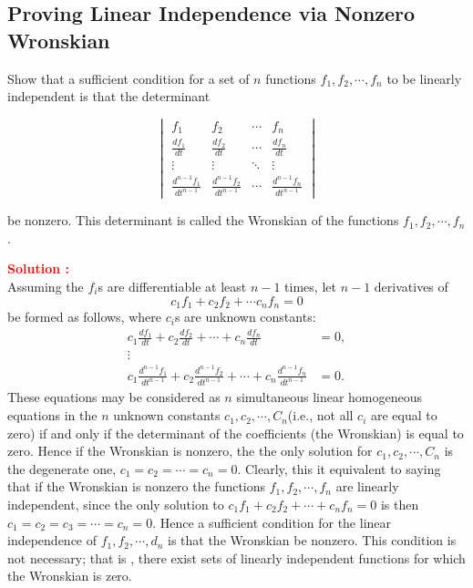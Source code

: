 \documentclass[12pt]{article}
\begin{document}
\clearpage
\subsection{Proving Linear Independence via Nonzero Wronskian}

Show that a sufficient condition for a set of \(n\) functions \(f_1,f_2,\cdots,f_n\) to be linearly independent is that the determinant 


\begin{equation}
    \begin{vmatrix}
f_1 & f_2 & \cdots & f_n \\
\frac{df_1}{dt} & \frac{df_2}{dt} & \cdots & \frac{df_n}{dt} \\
\vdots & \vdots & \ddots & \vdots \\
\frac{d^{n-1}f_1}{dt^{n-1}} & \frac{d^{n-1}f_2}{dt^{n-1}} & \cdots & \frac{d^{n-1}f_n}{dt^{n-1}}
\end{vmatrix}
\end{equation}

be nonzero. This determinant is called the Wronskian of the functions \(f_1,f_2,\cdots,f_n\).

\textbf{\textcolor{red}{Solution :}} \\

Assuming the \(f_i\)s are differentiable at least \(n-1\) times, let \(n-1\) derivatives of 
\begin{equation}
    c_1 f_1 + c_2 f_2 + \cdots c_n f_n = 0
\end{equation}
be formed as follows, where \(c_i\)s are unknown constants:
\begin{equation}
\begin{aligned}
c_1 \frac{d f_1}{dt} + c_2 \frac{d f_2}{dt} + \cdots + c_n \frac{d f_n}{dt} &= 0, \\
\vdots& \\
c_1 \frac{d^{n-1} f_1}{dt^{n-1}} + c_2 \frac{d^{n-1} f_2}{dt^{n-1}} + \cdots + c_n \frac{d^{n-1} f_n}{dt^{n-1}} &= 0.
\end{aligned}
\end{equation}
These equations may be considered as \(n\) simultaneous linear homogeneous equations in the \(n\) unknown constants \(c_1,c_2,\cdots,C_n\)(i.e., not all \(c_i\) are equal to zero) if and only if the determinant of the coefficients (the Wronskian) is equal to zero. Hence if the Wronskian is nonzero, the the only solution for \(c_1,c_2,\cdots,C_n\) is the degenerate one, \(c_1=c_2=\cdots=c_n = 0\). Clearly, this it equivalent to saying that if the Wronskian is nonzero the functions \(f_1,f_2,\cdots,f_n\) are linearly independent, since the only solution to \(c_1 f_1 + c_2 f_2 + \cdots + c_n f_n = 0\) is then \(c_1 = c_2 = c_3 = \cdots = c_n = 0\). Hence a sufficient condition for the linear independence of \(f_1,f_2,\cdots,d_n\) is that the Wronskian be nonzero. This condition is not necessary; that is , there exist sets of linearly independent functions for which the Wronskian is zero.
\end{document}
